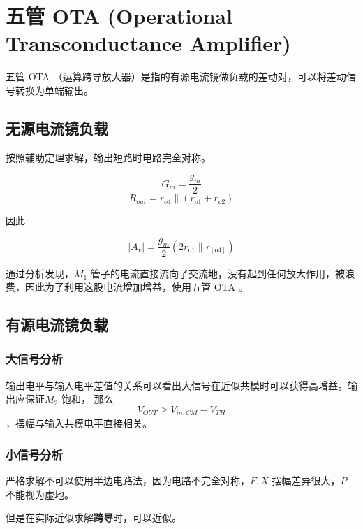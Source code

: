 \documentclass[cn,11pt,chinese,black,simple]{../elegantbook}
\begin{document}


\section{五管 OTA (Operational Transconductance Amplifier) }

五管 OTA （运算跨导放大器）是指的有源电流镜做负载的差动对，可以将差动信号转换为单端输出。

\subsection{无源电流镜负载}


按照辅助定理求解，输出短路时电路完全对称。

\[G_m =  \frac{g_m}{2}\] 
\[R_{out} = r_{o4} \| (r_{o1} + r_{o2})\]

因此

\[\left|A_v\right| = \frac{g_m}{2} \left(2 r_{o1} \| r_[o4]\right)\]

通过分析发现，\(M_1\) 管子的电流直接流向了交流地，没有起到任何放大作用，被浪费，因此为了利用这股电流增加增益，使用五管 OTA 。

\subsection{有源电流镜负载}


\subsubsection{大信号分析}

输出电平与输入电平差值的关系可以看出大信号在近似共模时可以获得高增益。输出应保证\(M_2\) 饱和， 那么 \[V_{OUT} \geq V_{in,CM} - V_{TH}\] ，摆幅与输入共模电平直接相关。


\subsubsection{小信号分析}

严格求解不可以使用半边电路法，因为电路不完全对称，\(F, X\) 摆幅差异很大，\(P\) 不能视为虚地。


但是在实际近似求解\textbf{跨导}时，可以近似。
\end{document}

